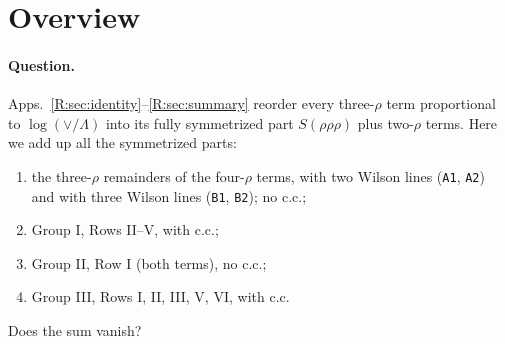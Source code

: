 \documentclass[10pt]{article}
\numberwithin{equation}{section}
\newcommand{\lab}[1]{\texttt{#1}}
\begin{document}
\section{Overview}\label{C:sec:answer}

\paragraph{Question.} Apps.~\ref{R:sec:identity}--\ref{R:sec:summary} reorder every three-$\rho$ term proportional to $\log(\vee/\Lambda)$ into its fully symmetrized part $S(\rho\rho\rho)$ plus two-$\rho$ terms. Here we add up all the symmetrized parts:
\begin{enumerate}
\item the three-$\rho$ remainders of the four-$\rho$ terms, with two Wilson lines (\lab{A1}, \lab{A2}) and with three Wilson lines (\lab{B1}, \lab{B2}); no c.c.;
\item Group I, Rows II--V, with c.c.;
\item Group II, Row I (both terms), no c.c.;
\item Group III, Rows I, II, III, V, VI, with c.c.
\end{enumerate}
Does the sum vanish?
\end{document}
